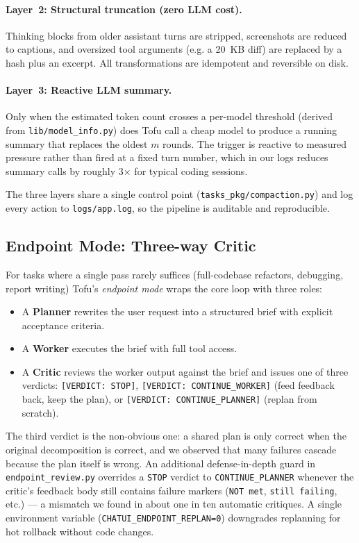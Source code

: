\documentclass[11pt]{article}
\begin{document}
\paragraph{Layer~2: Structural truncation (zero LLM cost).}
Thinking blocks from older assistant turns are stripped, screenshots are
reduced to captions, and oversized tool arguments (e.g. a 20~KB diff)
are replaced by a hash plus an excerpt. All transformations are
idempotent and reversible on disk.

\paragraph{Layer~3: Reactive LLM summary.}
Only when the estimated token count crosses a
per-model threshold (derived from
\texttt{lib/model\_info.py}) does Tofu call a cheap model to produce a
running summary that replaces the oldest $m$ rounds. The trigger is
reactive to measured pressure rather than fired at a fixed turn number,
which in our logs reduces summary calls by roughly 3$\times$ for typical
coding sessions.

The three layers share a single control point
(\texttt{tasks\_pkg/compaction.py}) and log every action to
\texttt{logs/app.log}, so the pipeline is auditable and reproducible.

\subsection{Endpoint Mode: Three-way Critic}
\label{sec:endpoint}

For tasks where a single pass rarely suffices (full-codebase refactors,
debugging, report writing) Tofu's \emph{endpoint mode} wraps the core
loop with three roles:

\begin{itemize}
\itemsep 1pt
\item A \textbf{Planner} rewrites the user request into a structured
  brief with explicit acceptance criteria.
\item A \textbf{Worker} executes the brief with full tool access.
\item A \textbf{Critic} reviews the worker output against the brief and
  issues one of three verdicts: \texttt{[VERDICT: STOP]},
  \texttt{[VERDICT: CONTINUE\_WORKER]} (feed feedback back, keep the
  plan), or \texttt{[VERDICT: CONTINUE\_PLANNER]} (replan from scratch).
\end{itemize}

The third verdict is the non-obvious one: a shared plan is only correct
when the original decomposition is correct, and we observed that many
failures cascade because the plan itself is wrong. An additional
defense-in-depth guard in \texttt{endpoint\_review.py} overrides a
\texttt{STOP} verdict to \texttt{CONTINUE\_PLANNER} whenever the critic's
feedback body still contains failure markers (\texttt{\textquotedbl NOT
met\textquotedbl}, \texttt{\textquotedbl still failing\textquotedbl},
etc.) --- a mismatch we found in about one in ten automatic critiques.
A single environment variable (\texttt{CHATUI\_ENDPOINT\_REPLAN=0})
downgrades replanning for hot rollback without code changes.
\end{document}
